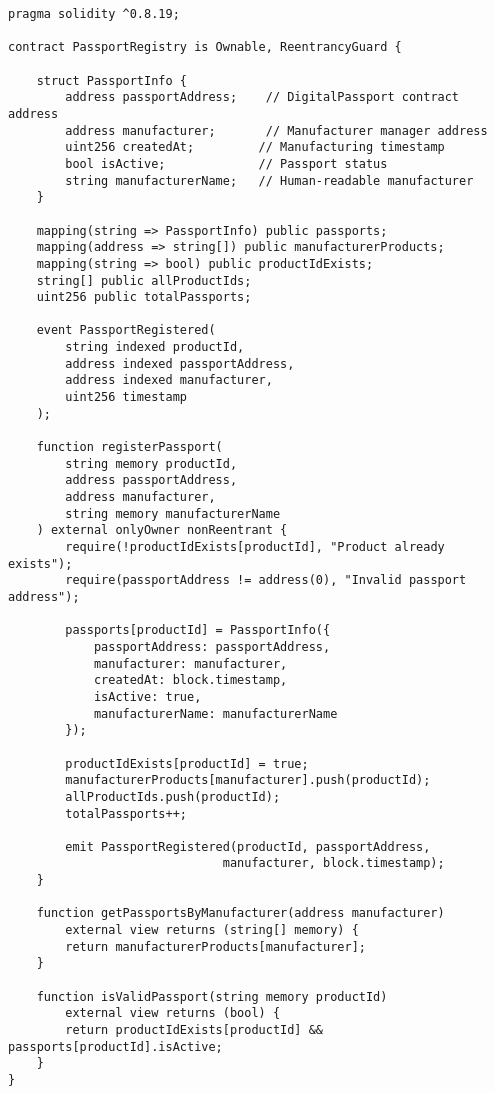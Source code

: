 \documentclass[11pt,a4paper]{article}
\begin{document}
\begin{verbatim}
pragma solidity ^0.8.19;

contract PassportRegistry is Ownable, ReentrancyGuard {
    
    struct PassportInfo {
        address passportAddress;    // DigitalPassport contract address
        address manufacturer;       // Manufacturer manager address
        uint256 createdAt;         // Manufacturing timestamp
        bool isActive;             // Passport status
        string manufacturerName;   // Human-readable manufacturer
    }
    
    mapping(string => PassportInfo) public passports;
    mapping(address => string[]) public manufacturerProducts;
    mapping(string => bool) public productIdExists;
    string[] public allProductIds;
    uint256 public totalPassports;
    
    event PassportRegistered(
        string indexed productId,
        address indexed passportAddress,
        address indexed manufacturer,
        uint256 timestamp
    );
    
    function registerPassport(
        string memory productId,
        address passportAddress,
        address manufacturer,
        string memory manufacturerName
    ) external onlyOwner nonReentrant {
        require(!productIdExists[productId], "Product already exists");
        require(passportAddress != address(0), "Invalid passport address");
        
        passports[productId] = PassportInfo({
            passportAddress: passportAddress,
            manufacturer: manufacturer,
            createdAt: block.timestamp,
            isActive: true,
            manufacturerName: manufacturerName
        });
        
        productIdExists[productId] = true;
        manufacturerProducts[manufacturer].push(productId);
        allProductIds.push(productId);
        totalPassports++;
        
        emit PassportRegistered(productId, passportAddress, 
                              manufacturer, block.timestamp);
    }
    
    function getPassportsByManufacturer(address manufacturer) 
        external view returns (string[] memory) {
        return manufacturerProducts[manufacturer];
    }
    
    function isValidPassport(string memory productId) 
        external view returns (bool) {
        return productIdExists[productId] && passports[productId].isActive;
    }
}
\end{verbatim}
\end{document}
